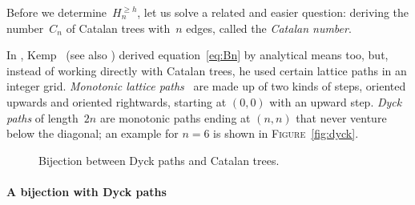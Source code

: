 \documentclass[11pt]{article}
\newcommand\fig{\textsc{Figure}}
\newcommand{\B}[2]{H_{#1}^{\geqslant #2}}
\begin{document}
Before we determine~\(\B{n}{h}\), let us solve a related and easier
question: deriving the number~\(C_n\) of Catalan trees with~\(n\)
edges, called the \emph{Catalan number}.

In , Kemp~\cite[p.~64]{Kemp:1984} (see also
\cite{FlajoletNebelProdinger:2006}) derived equation~\eqref{eq:Bn} by
analytical means too, but, instead of working directly with Catalan
trees, he used certain lattice paths in an integer grid. 
\emph{Monotonic lattice paths}~\cite{Mohanty:1979,Humphreys:2010} are
made up of two kinds of steps, oriented upwards and oriented rightwards,
starting at \((0,0)\) with an upward step. \emph{Dyck paths} of
length~\(2n\) are monotonic paths ending at \((n,n)\) that never
venture below the diagonal; an example for \(n=6\) is shown in
\fig~\ref{fig:dyck}.
\begin{figure}
\centering
{}
\qquad\qquad
{}
\caption{Bijection between Dyck paths and Catalan trees.\label{fig:bijection}}
\end{figure}

\paragraph{A bijection with Dyck paths}
\end{document}
